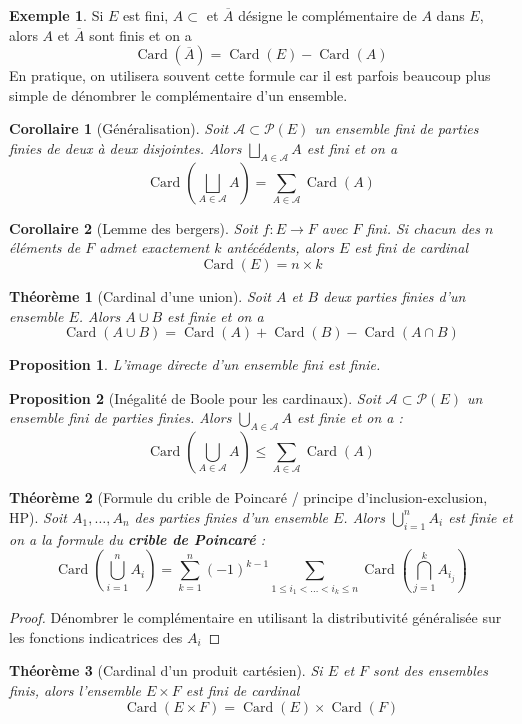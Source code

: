 \documentclass[french]{book}
\theoremstyle{plain}
\newtheorem{thm}{Théorème}[chapter]
\newtheorem{prop}{Proposition}[chapter]
\newtheorem{cor}{Corollaire}[chapter]
\theoremstyle{definition}
\newtheorem{exa}{Exemple}[chapter]
\theoremstyle{remark}
\DeclareMathOperator{\card}{Card}
\begin{document}
\begin{exa}
	Si $E$ est fini, $A\subset$ et $\overline{A}$ désigne le complémentaire de $A$ dans $E$, alors $A$ et $\overline{A}$ sont finis et on a $$\card(\overline{A})=\card(E)-\card(A)$$ En pratique, on utilisera souvent cette formule car il est parfois beaucoup plus simple de dénombrer le complémentaire d'un ensemble.
\end{exa}
\begin{cor}[Généralisation]
	Soit $\mathcal{A}\subset\mathcal{P}(E)$ un ensemble fini de parties finies de deux à deux disjointes. Alors $\displaystyle \bigsqcup_{A\in\mathcal{A}}A$ est fini et on a $$\card\left(\bigsqcup_{A\in\mathcal{A}}A\right)=\sum_{A\in\mathcal{A}}\card(A)$$
\end{cor}
\begin{cor}[Lemme des bergers]
	Soit $f:E\rightarrow F$ avec $F$ fini. Si chacun des $n$ éléments de $F$ admet exactement $k$ antécédents, alors $E$ est fini de cardinal $$\card(E)=n\times k$$
\end{cor}
\begin{thm}[Cardinal d'une union]
	Soit $A$ et $B$ deux parties finies d'un ensemble $E$. Alors $A\cup B$ est finie et on a $$\card(A\cup B)=\card(A)+\card(B)-\card(A\cap B)$$
\end{thm}
\begin{prop}
	L'image directe d'un ensemble fini est finie.
\end{prop}
\begin{prop}[Inégalité de Boole pour les cardinaux]
	Soit $\mathcal{A}\subset\mathcal{P}(E)$ un ensemble fini de parties finies. Alors $\displaystyle \bigcup_{A\in\mathcal{A}}A$ est finie et on a : $$\card\left(\bigcup_{A\in\mathcal{A}}A\right)\leqslant\sum_{A\in\mathcal{A}}\card(A)$$
\end{prop}
\begin{thm}[Formule du crible de Poincaré / principe d'inclusion-exclusion, HP]
	Soit $A_1,\ldots,A_n$ des parties finies d'un ensemble $E$. Alors $\displaystyle \bigcup_{i=1}^{n}A_i$ est finie et on a la formule du \textbf{crible de Poincaré} : $$\card\left(\bigcup_{i=1}^{n}A_i\right)=\sum_{k=1}^{n}(-1)^{k-1}\sum_{1\leqslant i_1<\ldots<i_k\leqslant n}\card\left(\bigcap_{j=1}^{k}A_{i_j}\right)$$
\end{thm}
\begin{proof}
	Dénombrer le complémentaire en utilisant la distributivité généralisée sur les fonctions indicatrices des $A_i$
\end{proof}
\begin{thm}[Cardinal d'un produit cartésien]
	Si $E$ et $F$ sont des ensembles finis, alors l'ensemble $E\times F$ est fini de cardinal $$\card(E\times F)=\card(E)\times\card(F)$$
\end{thm}
\end{document}
